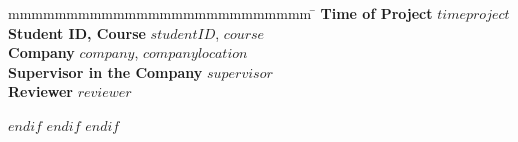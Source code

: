 \documentclass[
	$if(lang)$$babel-lang$,$endif$$if(fontsize)$$fontsize$,$else$12pt,$endif$ %
	$if(lang)$$babel-lang$,$endif$oneside,			%
	pagesize,
	$if(papersize)$paper=$papersize$,$else$paper=a4,$endif$
	parskip=half,		%
	headheight = 18pt,	%
	headsepline,		%
	footsepline,		%
	footheight = 18pt,	%
	abstract=true,		%
	DIV=calc,		%
	BCOR=8mm,		%
	headinclude=false,	%
	footinclude=false,	%
	toc=bibliography,	%
]{scrbook}	%
\begin{document}
\begin{spacing}{1}
\begin{titlepage}
			\begin{spacing}{1.2}
				\begin{tabbing}
					mmmmmmmmmmmmmmmmmmmmmmmmmm             \= \kill
					\textbf{
					Time of Project}       \>  $timeproject$\\
					\textbf{
					Student ID, Course
					}  \>  $studentID$, $course$\\
					\textbf{
					Company
					}                  \>  $company$, $companylocation$\\
					\textbf{
					Supervisor in the Company
					}               \>  $supervisor$\\
					\textbf{
					Reviewer
					}              \>  $reviewer$
				\end{tabbing}
			\end{spacing}
		\end{titlepage}
	\end{spacing}
	\newpage
	$endif$
	$endif$
	$endif$


\end{document}
